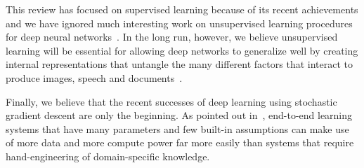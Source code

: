 \documentclass[]{article}
\begin{document}
This review has focused on supervised learning because of its recent
achievements and we have ignored much interesting work on unsupervised
learning procedures for deep neural 
networks~\citep{Salakhutdinov2009-small,Hinton95,QuocLe-ICML2012,VincentPLarochelleH2008-small,ranzato-pami,Kingma-et-al-NIPS2014}. 
In the long run,
however, we believe unsupervised learning will be essential for allowing
deep networks to generalize well by creating internal representations that
untangle the many different factors that interact to produce images, speech
and documents~\citep{Yann,Bengio-Courville-Vincent-TPAMI2013}.

Finally, we believe that the recent successes of deep learning using
stochastic gradient descent are only the beginning.  As pointed out
in~\citet{Bengio+Lecun-chapter2007-small}, end-to-end learning
systems that have many parameters and few built-in assumptions can make use
of more data and more compute power far more easily than systems that
require hand-engineering of domain-specific knowledge.

 








\end{document}
